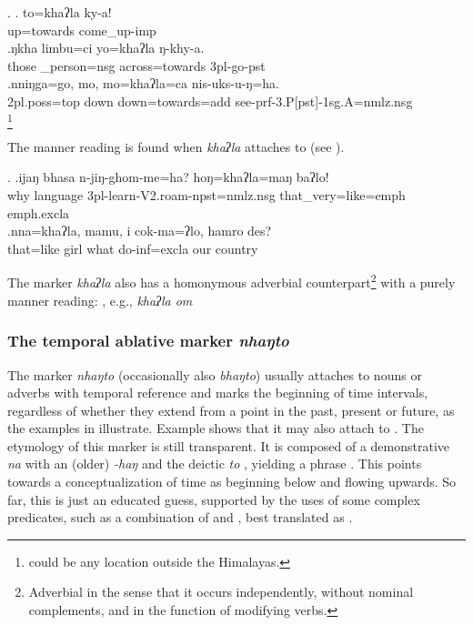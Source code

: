 \ex. \ag. to=khaʔla ky-a!\\
up=towards come\_up{\sc -imp}\\
\bg.ŋkha limbu=ci             yo=khaʔla  ŋ-khy-a.\\
those \_person{\sc =nsg} across=towards {\sc 3pl-}go{\sc -pst}\\
 
\bg.nniŋga=go,          mo,  mo=khaʔla=ca        nis-uks-u-ŋ=ha.\\
{\sc 2pl.poss=top} down down=towards{\sc =add} see{\sc -prf-3.P[pst]-1sg.A=nmlz.nsg}\\
\footnote{ could be any location outside the Himalayas.}

The manner reading is found when \emph{khaʔla}  attaches to  (see \Next).

\ex. \ag.ijaŋ bhasa    n-jiŋ-ghom-me=ha?                        hoŋ=khaʔla=maŋ baʔlo!\\
why language {\sc 3pl-}learn{\sc -V2.roam-npst=nmlz.nsg} that\_very=like{\sc =emph} {\sc emph.excla}\\
 
\bg.nna=khaʔla, mamu, i    cok-ma=ʔlo,               hamro des?\\
that=like girl what do{\sc -inf=excla} our country\\
 

The marker \emph{khaʔla} also has a homonymous adverbial counterpart\footnote{Adverbial in the sense that it occurs independently, without nominal complements, and in the function of  modifying verbs.} with a purely manner reading: , e.g.,  \emph{khaʔla om}  

\subsubsection{The temporal ablative marker \emph{nhaŋto} }
   
   The marker \emph{nhaŋto} (occasionally also \emph{bhaŋto}) usually attaches to nouns or adverbs with temporal reference and marks the beginning of time intervals, regardless of whether they extend from a point in the past, present or future, as the examples in \Next illustrate. Example \Next[d] shows that it may also attach to  . The etymology of this marker is still transparent. It is composed of a demonstrative \emph{na} with an (older)  \emph{-haŋ} and the deictic  \emph{to} , yielding a phrase . This points towards a conceptualization of time as beginning below and flowing upwards. So  far, this is just an educated guess, supported by the uses of some complex predicates, such as a combination of  and , best translated as .
 
